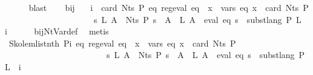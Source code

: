 \begin{isabellebody}
\ \ \ \ \isamarkupfalse%
\ blast\isanewline
\ \ \isamarkupfalse%
\ bij{\isacharunderscore}{\kern0pt}{\isasymgamma}{\isacharunderscore}{\kern0pt}{\isasymgamma}{\isacharprime}{\kern0pt}\ {\isacharasterisk}{\kern0pt}\ \isamarkupfalse%
\ {\isachardoublequoteopen}{\isasymforall}i\ {\isacharless}{\kern0pt}\ card\ {\isacharparenleft}{\kern0pt}Nts\ P{\isacharparenright}{\kern0pt}{\isachardot}{\kern0pt}\ {\isasymexists}eq{\isachardot}{\kern0pt}\ reg{\isacharunderscore}{\kern0pt}eval\ eq\ {\isasymand}\ {\isacharparenleft}{\kern0pt}{\isasymforall}x\ {\isasymin}\ vars\ eq{\isachardot}{\kern0pt}\ x\ {\isacharless}{\kern0pt}\ card\ {\isacharparenleft}{\kern0pt}Nts\ P{\isacharparenright}{\kern0pt}{\isacharparenright}{\kern0pt}\isanewline
\ \ \ \ \ \ \ \ \ \ \ \ \ \ \ \ \ \ \ \ {\isasymand}\ {\isacharparenleft}{\kern0pt}{\isasymforall}s\ L{\isachardot}{\kern0pt}\ {\isacharparenleft}{\kern0pt}{\isasymforall}A\ {\isasymin}\ Nts\ P{\isachardot}{\kern0pt}\ s\ {\isacharparenleft}{\kern0pt}{\isasymgamma}{\isacharprime}{\kern0pt}\ A{\isacharparenright}{\kern0pt}\ {\isacharequal}{\kern0pt}\ L\ A{\isacharparenright}{\kern0pt}\ {\isasymlongrightarrow}\ eval\ eq\ s\ {\isacharequal}{\kern0pt}\ subst{\isacharunderscore}{\kern0pt}lang\ P\ L\ {\isacharparenleft}{\kern0pt}{\isasymgamma}\ i{\isacharparenright}{\kern0pt}{\isacharparenright}{\kern0pt}{\isachardoublequoteclose}\isanewline
\ \ \ \ \isamarkupfalse%
\ bij{\isacharunderscore}{\kern0pt}Nt{\isacharunderscore}{\kern0pt}Var{\isacharunderscore}{\kern0pt}def\ \isamarkupfalse%
\ metis\isanewline
\ \ \isamarkupfalse%
\ Skolem{\isacharunderscore}{\kern0pt}list{\isacharunderscore}{\kern0pt}nth{\isacharbrackleft}{\kern0pt}\ P{\isacharequal}{\kern0pt}{\isachardoublequoteopen}{\isasymlambda}i\ eq{\isachardot}{\kern0pt}\ reg{\isacharunderscore}{\kern0pt}eval\ eq\ {\isasymand}\ {\isacharparenleft}{\kern0pt}{\isasymforall}x\ {\isasymin}\ vars\ eq{\isachardot}{\kern0pt}\ x\ {\isacharless}{\kern0pt}\ card\ {\isacharparenleft}{\kern0pt}Nts\ P{\isacharparenright}{\kern0pt}{\isacharparenright}{\kern0pt}\isanewline
\ \ \ \ \ \ \ \ \ \ \ \ \ \ \ \ \ \ \ \ \ \ \ {\isasymand}\ {\isacharparenleft}{\kern0pt}{\isasymforall}s\ L{\isachardot}{\kern0pt}\ {\isacharparenleft}{\kern0pt}{\isasymforall}A\ {\isasymin}\ Nts\ P{\isachardot}{\kern0pt}\ s\ {\isacharparenleft}{\kern0pt}{\isasymgamma}{\isacharprime}{\kern0pt}\ A{\isacharparenright}{\kern0pt}\ {\isacharequal}{\kern0pt}\ L\ A{\isacharparenright}{\kern0pt}\ {\isasymlongrightarrow}\ eval\ eq\ s\ {\isacharequal}{\kern0pt}\ subst{\isacharunderscore}{\kern0pt}lang\ P\ L\ {\isacharparenleft}{\kern0pt}{\isasymgamma}\ i{\isacharparenright}{\kern0pt}{\isacharparenright}{\kern0pt}{\isachardoublequoteclose}{\isacharbrackright}{\kern0pt}\isanewline

\end{isabellebody}
